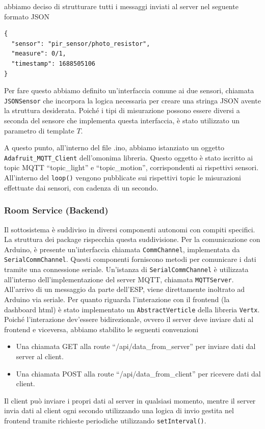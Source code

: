 \documentclass[a4paper,12pt]{report}
\begin{document}
abbiamo deciso di strutturare tutti i messaggi inviati al server nel seguente formato JSON
\begin{lstlisting}[style=json]
{
  "sensor": "pir_sensor/photo_resistor",
  "measure": 0/1,
  "timestamp": 1688505106
}
\end{lstlisting}
Per fare questo abbiamo definito un'interfaccia comune ai due sensori, chiamata \texttt{JSONSensor} che incorpora la logica necessaria per creare una stringa JSON avente la struttura desiderata. Poiché i tipi di misurazione possono essere diversi a seconda del sensore che implementa questa interfaccia, è stato utilizzato un parametro di template $T$.

A questo punto, all'interno del file .ino, abbiamo istanziato un oggetto \texttt{Adafruit\_MQTT\_Client} dell'omonima libreria. Questo oggetto è stato iscritto ai topic MQTT ``topic\_light'' e ``topic\_motion'', corrispondenti ai rispettivi sensori.
All'interno del \texttt{loop()} vengono pubblicate sui rispettivi topic le misurazioni effettuate dai sensori, con cadenza di un secondo.

\subsubsection{Room Service (Backend)}
Il sottosistema è suddiviso in diversi componenti autonomi con compiti specifici. La struttura dei package rispecchia questa suddivisione.
Per la comunicazione con Arduino, è presente un'interfaccia chiamata \texttt{CommChannel}, implementata da \texttt{SerialCommChannel}. Questi componenti forniscono metodi per comunicare i dati tramite una connessione seriale.
Un'istanza di \texttt{SerialCommChannel} è utilizzata all'interno dell'implementazione del server MQTT, chiamata \texttt{MQTTServer}. All'arrivo di un messaggio da parte dell'ESP, viene direttamente inoltrato ad Arduino via seriale.
Per quanto riguarda l'interazione con il frontend (la dashboard html) è stato implementato un \texttt{AbstractVerticle} della libreria \texttt{Vertx}. Poiché l'interazione dev'essere bidirezionale, ovvero il server deve inviare dati al frontend e viceversa, abbiamo stabilito le seguenti convenzioni 
\begin{itemize}
    \item Una chiamata GET alla route ``/api/data\_from\_server'' per inviare dati dal server al client.
    \item Una chiamata POST alla route ``/api/data\_from\_client'' per ricevere dati dal client.
\end{itemize}
Il client può inviare i propri dati al server in qualsiasi momento, mentre il server invia dati al client ogni secondo utilizzando una logica di invio gestita nel frontend tramite richieste periodiche utilizzando \texttt{setInterval()}.
\end{document}
